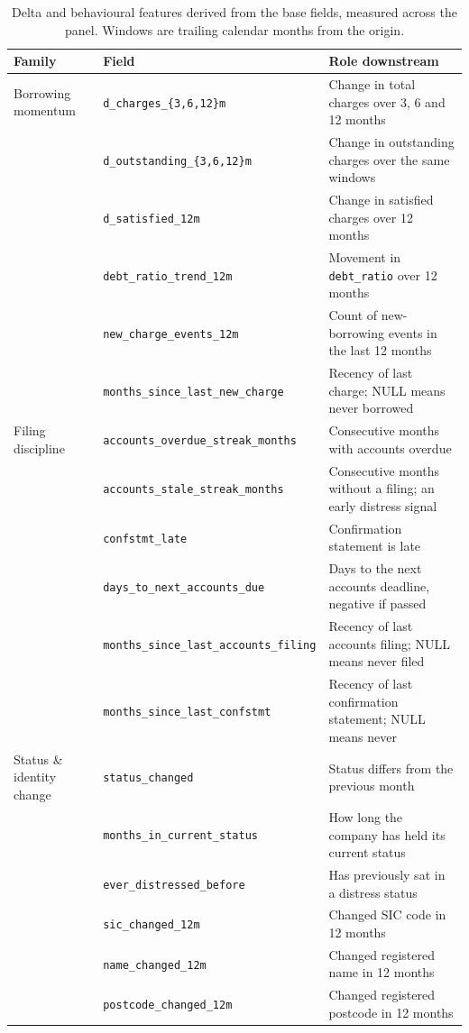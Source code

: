 \documentclass[    author={Samuel Menon Demelo; Sneha Saphala Ram Prasad; 
Viktor Ander Lindholm; Vishal Khatri},
               supervisor={Prof. Fernando Moreno-Pino},
                   degree={MSc},
                    title={Lloyds Commercial Banking Intelligence},
                 subtitle={Ranking SME Lending, Risk and Growth Prospects for Lloyds Banking Group},
                     type={},
                     year={2026}]{dissertation}
\begin{document}
\begin{collapsable}
\begin{table}[htbp]
\centering
\small
\caption[Delta and behavioural features derived from the base fields]{Delta and behavioural features derived from the base fields, measured
across the panel. Windows are trailing calendar months from the origin.}
\label{tab:delta-fields}
\begin{tabular}{@{}llp{7.0cm}@{}}
\toprule
\textbf{Family} & \textbf{Field} & \textbf{Role downstream} \\
\midrule
Borrowing momentum
    & \texttt{d\_charges\_\{3,6,12\}m}
    & Change in total charges over 3, 6 and 12 months \\
    & \texttt{d\_outstanding\_\{3,6,12\}m}
    & Change in outstanding charges over the same windows \\
    & \texttt{d\_satisfied\_12m}
    & Change in satisfied charges over 12 months \\
    & \texttt{debt\_ratio\_trend\_12m}
    & Movement in \texttt{debt\_ratio} over 12 months \\
    & \texttt{new\_charge\_events\_12m}
    & Count of new-borrowing events in the last 12 months \\
    & \texttt{months\_since\_last\_new\_charge}
    & Recency of last charge; NULL means never borrowed \\
\midrule
Filing discipline
    & \texttt{accounts\_overdue\_streak\_months}
    & Consecutive months with accounts overdue \\
    & \texttt{accounts\_stale\_streak\_months}
    & Consecutive months without a filing; an early distress signal \\
    & \texttt{confstmt\_late}
    & Confirmation statement is late \\
    & \texttt{days\_to\_next\_accounts\_due}
    & Days to the next accounts deadline, negative if passed \\
    & \texttt{months\_since\_last\_accounts\_filing}
    & Recency of last accounts filing; NULL means never filed \\
    & \texttt{months\_since\_last\_confstmt}
    & Recency of last confirmation statement; NULL means never \\
\midrule
Status \& identity change
    & \texttt{status\_changed}
    & Status differs from the previous month \\
    & \texttt{months\_in\_current\_status}
    & How long the company has held its current status \\
    & \texttt{ever\_distressed\_before}
    & Has previously sat in a distress status \\
    & \texttt{sic\_changed\_12m}
    & Changed SIC code in 12 months \\
    & \texttt{name\_changed\_12m}
    & Changed registered name in 12 months \\
    & \texttt{postcode\_changed\_12m}
    & Changed registered postcode in 12 months \\
\bottomrule
\end{tabular}
\end{table}
\end{collapsable}
\end{document}
